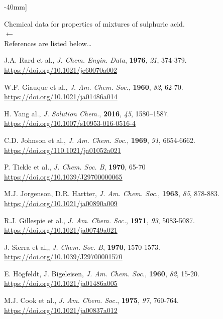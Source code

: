 \documentclass[]{tufte-handout}
\begin{document}
\begin{table}[h!]
\centering
\caption[][-40mm]{Chemical data for properties of mixtures of sulphuric acid. \\ $\longleftarrow$ \\ \vspace{2mm}References are listed below\ldots \vspace{2mm}

\noindent J.A. Rard et al., \textit{J. Chem. Engin. Data}, \textbf{1976}, \textit{21}, 374-379. \url{https://doi.org/10.1021/je60070a002} \vspace{1mm}

\noindent W.F. Giauque et al., \textit{J. Am. Chem. Soc.}, \textbf{1960}, \textit{82}, 62-70. \url{https://doi.org/10.1021/ja01486a014} \vspace{1mm}

\noindent H. Yang al., \textit{J. Solution Chem.}, \textbf{2016}, \textit{45}, 1580–1587. \url{https://doi.org/10.1007/s10953-016-0516-4} \vspace{1mm}

\noindent C.D. Johnson et al., \textit{J. Am. Chem. Soc.}, \textbf{1969}, \textit{91}, 6654-6662. \url{https://doi.org/110.1021/ja01052a021} \vspace{1mm}

\noindent P. Tickle et al., \textit{J. Chem. Soc. B}, \textbf{1970}, 65-70 \url{https://doi.org/10.1039/J29700000065} \vspace{1mm}

\noindent M.J. Jorgenson, D.R. Hartter, \textit{J. Am. Chem. Soc.}, \textbf{1963}, \textit{85}, 878-883. \url{https://doi.org/10.1021/ja00890a009} \vspace{1mm}

\noindent R.J. Gillespie et al., \textit{J. Am. Chem. Soc.}, \textbf{1971}, \textit{93}, 5083-5087. \url{https://doi.org/10.1021/ja00749a021} \vspace{1mm}

\noindent J. Sierra et al,, \textit{J. Chem. Soc. B}, \textbf{1970}, 1570-1573. \url{https://doi.org/10.1039/J29700001570} \vspace{1mm}

\noindent E. H{\"o}gfeldt,  J. Bigeleisen, \textit{J. Am. Chem. Soc.}, \textbf{1960}, \textit{82}, 15-20. \url{https://doi.org/10.1021/ja01486a005} \vspace{1mm}

\noindent M.J. Cook et al., \textit{J. Am. Chem. Soc.}, \textbf{1975}, \textit{97}, 760-764. \url{https://doi.org/10.1021/ja00837a012} \vspace{1mm}

}
\end{table}
\end{document}

